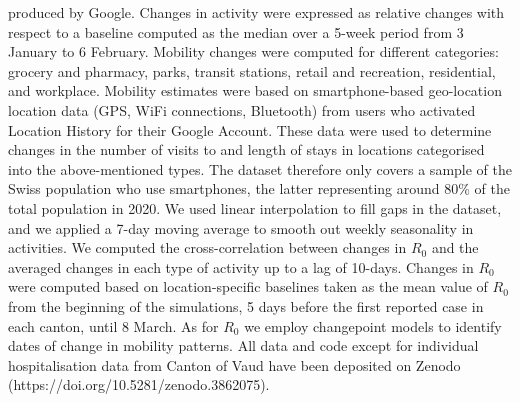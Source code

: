 produced by Google\cite{GoogleLLC:GoogleCOVID19Community:2020}. Changes in activity were expressed as relative changes with respect to a baseline computed as the median over a 5-week period from 3 January to 6 February. Mobility changes were computed for different categories: grocery and pharmacy, parks, transit stations, retail and recreation, residential, and workplace. Mobility estimates were based on smartphone-based geo-location location data (GPS, WiFi connections, Bluetooth) from users who activated Location History for their Google Account. These data were used to determine changes in the number of visits to and length of stays in locations categorised into the above-mentioned types. The dataset therefore only covers a sample of the Swiss population who use smartphones, the latter representing around 80\% of the total population in 2020\cite{ODea:SmartphoneUsersSwitzerland:2020}. We used linear interpolation to fill gaps in the dataset, and we applied a 7-day moving average to smooth out weekly seasonality in activities. We computed the cross-correlation between changes in $R_0$ and the averaged changes in each type of activity up to a lag of 10-days. Changes in $R_0$ were computed based on location-specific baselines taken as the mean value of $R_0$ from the beginning of the simulations, 5 days before the first reported case in each canton, until 8 March. As for $R_0$ we employ changepoint models to identify dates of change in mobility patterns. All data and code except for individual hospitalisation data from Canton of Vaud have been deposited on Zenodo (https://doi.org/10.5281/zenodo.3862075).

